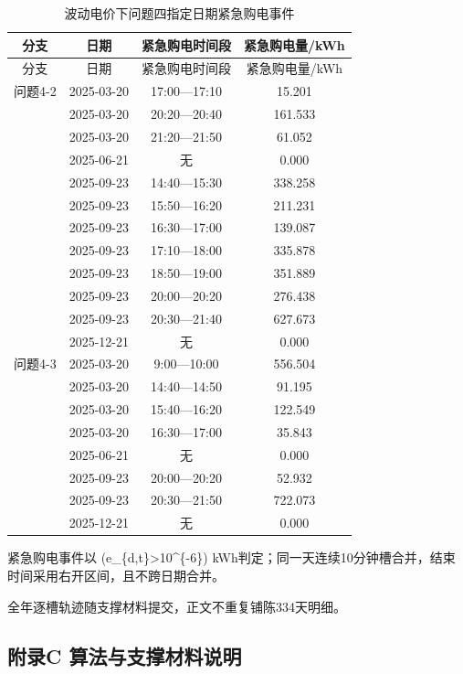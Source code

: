 \documentclass[zihao=-4,a4paper,UTF8,fontset=none]{ctexart}
\begin{document}
\begingroup\renewcommand{\tablename}{附表}\renewcommand{\thetable}{B-12}

\begin{longtable}[]{@{}cccc@{}}
\caption{波动电价下问题四指定日期紧急购电事件}\label{tab:appendix-B-12}\tabularnewline
\toprule\noalign{}
分支 & 日期 & 紧急购电时间段 & 紧急购电量/kWh \\
\midrule\noalign{}
\endfirsthead
\toprule\noalign{}
分支 & 日期 & 紧急购电时间段 & 紧急购电量/kWh \\
\midrule\noalign{}
\endhead
\bottomrule\noalign{}
\endlastfoot
问题4-2 & 2025-03-20 & 17:00---17:10 & 15.201 \\
& 2025-03-20 & 20:20---20:40 & 161.533 \\
& 2025-03-20 & 21:20---21:50 & 61.052 \\
& 2025-06-21 & 无 & 0.000 \\
& 2025-09-23 & 14:40---15:30 & 338.258 \\
& 2025-09-23 & 15:50---16:20 & 211.231 \\
& 2025-09-23 & 16:30---17:00 & 139.087 \\
& 2025-09-23 & 17:10---18:00 & 335.878 \\
& 2025-09-23 & 18:50---19:00 & 351.889 \\
& 2025-09-23 & 20:00---20:20 & 276.438 \\
& 2025-09-23 & 20:30---21:40 & 627.673 \\
& 2025-12-21 & 无 & 0.000 \\
问题4-3 & 2025-03-20 & 9:00---10:00 & 556.504 \\
& 2025-03-20 & 14:40---14:50 & 91.195 \\
& 2025-03-20 & 15:40---16:20 & 122.549 \\
& 2025-03-20 & 16:30---17:00 & 35.843 \\
& 2025-06-21 & 无 & 0.000 \\
& 2025-09-23 & 20:00---20:20 & 52.932 \\
& 2025-09-23 & 20:30---21:50 & 722.073 \\
& 2025-12-21 & 无 & 0.000 \\
\end{longtable}

\endgroup

紧急购电事件以 (e\_\{d,t\}\textgreater10\^{}\{-6\}) kWh判定；同一天连续10分钟槽合并，结束时间采用右开区间，且不跨日期合并。

全年逐槽轨迹随支撑材料提交，正文不重复铺陈334天明细。

\subsection*{附录C 算法与支撑材料说明}
\end{document}
